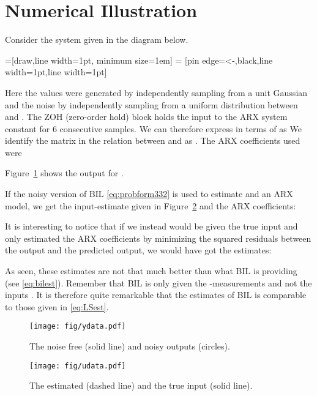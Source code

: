 \documentclass{ifacconf}
\newcommand{\0}{{\bf 0}}
\begin{document}
\section{Numerical Illustration}
Consider the system given in the diagram below. \begin{center}
=[draw,line width=1pt, minimum size=1em]
 = [pin edge={<-,black,line width=1pt},line width=1pt]
\end{center}
\bigskip


Here the values  were generated by independently sampling from a unit Gaussian
and the noise  by independently sampling from  a uniform distribution between
 and . The
ZOH (zero-order hold) block holds the input to the ARX system constant for 6 consecutive
samples. We can therefore express  in terms of  as
We identify the matrix in the relation between  and
 as . 
The ARX coefficients used were  
 
Figure~\ref{fig:ydata}  shows the output  for . 




If the noisy version of  BIL \eqref{eq:probform332} is used to estimate  and an ARX model, we get the input-estimate given in Figure~\ref{fig:udata} and the ARX
coefficients:

It is interesting to notice that if we instead would be given the true input
 and only estimated the ARX coefficients by minimizing the squared
residuals between the output  and the predicted output, we would
have got the estimates:   

As seen, these estimates are not that much better than what BIL is
providing (see \eqref{eq:bilest}). Remember that BIL is
only given the -measurements and not the inputs . It is
therefore quite remarkable that the estimates of BIL is comparable to
those given in \eqref{eq:LSest}. 
\begin{figure}
\texttt{[image: fig/ydata.pdf]}
\caption{The noise free (solid line) and noisy outputs (circles).}
\label{fig:ydata}
 \end{figure}
\begin{figure}
\texttt{[image: fig/udata.pdf]}
\caption{The estimated (dashed line) and the true input  (solid line).}
\label{fig:udata}
 \end{figure}
\end{document}
